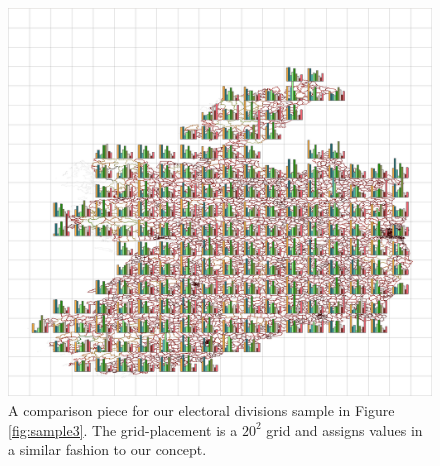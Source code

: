\begin{figure} \centering
\includegraphics[width=1\textwidth]{images/ch5/irelandgridBFull.png}
\caption{A comparison piece for our electoral divisions sample in Figure \ref{fig:sample3}. The grid-placement is a $20^2$ grid and assigns values in a similar fashion to our concept.}
\end{figure}
